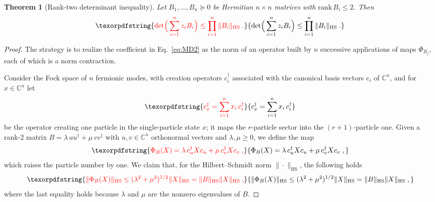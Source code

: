 \documentclass[prx,twocolumn,superscriptaddress,aps,10pt, frontmatterverbose, reprint,footinbib,longbibliography=true]{revtex4-2}
\newtheorem{theorem}{Theorem}
\providecommand{\DIFaddtex}[1]{{\protect\color{red}#1}} %
\providecommand{\DIFaddbegin}{\protect\color{red}} %
\providecommand{\DIFaddend}{\protect\color{black}} %
\providecommand{\DIFaddtex}[1]{\texorpdfstring{\DIFaddtex{#1}}{#1}} %
\providecommand{\DIFadd}[1]{\texorpdfstring{\DIFaddtex{#1}}{#1}} %
\newcommand{\DIFaddincludegraphics}[2][]{{\color{blue}\fbox{\DIFOincludegraphics[#1]{#2}}}} %
\DeclareRobustCommand{\DIFaddbegin}{\DIFOaddbegin \let\includegraphics\DIFaddincludegraphics} %
\DeclareRobustCommand{\DIFaddend}{\DIFOaddend \let\includegraphics\DIFOincludegraphics} %
\begin{document}
\begin{theorem}[Rank-two determinant inequality]
\label{thm:MD2}
Let $B_1,\dots,B_n\succeq0$ be Hermitian $n\times n$ matrices with $\mathrm{rank}\,B_i\le2$. Then
\DIFaddbegin \begin{equation}
    [\DIFadd{z_1\cdots z_n}]\DIFadd{\det\!\Big(\sum_{i=1}^nz_iB_i\Big)\le\prod_{i=1}^n\|B_i\|_{\mathrm{HS}}\;.
    \label{eq:MD2}
}\end{equation}\DIFaddend 
\end{theorem}

\begin{proof}
The strategy is to realize the coefficient in Eq.~\eqref{eq:MD2} as the norm of an operator built by $n$ successive applications of maps $\Phi_{B_j}$, each of which is a norm contraction.

Consider the Fock space of $n$ fermionic modes, with creation operators $c_i^\dagger$ associated with the canonical basis vectors $e_i$ of $\mathbb{C}^n$, and for $x\in\mathbb{C}^n$ let
\DIFaddbegin \begin{equation}
  \DIFadd{c_x^\dagger=\sum_{i=1}^n x_i\,c_i^\dagger
}\end{equation}\DIFaddend  
be the operator creating one particle in the single-particle state $x$; it maps the $r$-particle sector into the $(r+1)$-particle one. Given a rank-2 matrix $B=\lambda\,uu^\dagger+\mu\,vv^\dagger$ with $u,v \in \mathbb{C}^n$ orthonormal vectors and $\lambda,\mu\ge0$, we define the map
\DIFaddbegin \begin{equation}
    \DIFadd{\Phi_B(X)=\lambda\,c_u^\dagger Xc_u+\mu\,c_v^\dagger Xc_v\;,
}\end{equation}\DIFaddend 
which raises the particle number by one.
We claim that, for the Hilbert--Schmidt norm \DIFaddbegin \DIFadd{$\|\cdot\|_{\mathrm{HS}}$}\DIFaddend , the following holds
\DIFaddbegin \begin{equation}\DIFadd{\|\Phi_B(X)\|_{\mathrm{HS}}\le(\lambda^2+\mu^2)^{1/2}\|X\|_{\mathrm{HS}}=\|B\|_{\mathrm{HS}}\|X\|_{\mathrm{HS}}\;,
    \label{eq:Phi-contraction}
}\end{equation}\DIFaddend 
where the last equality \DIFaddbegin \DIFadd{holds because $\lambda$ and $\mu$ are the nonzero eigenvalues of $B$}\DIFaddend .


\end{proof}
\end{document}
